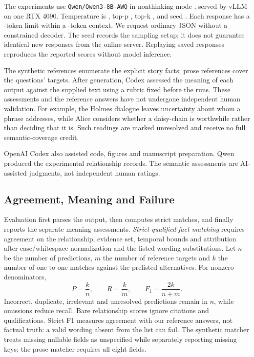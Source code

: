 \documentclass[a4paper,twoside]{article}
\begin{document}
The experiments use \texttt{Qwen/Qwen3-8B-AWQ} in nonthinking mode \cite{qwen2025,qwenmodel}, served by vLLM \cite{kwon2023} on one RTX 4090. Temperature is \Temperature, top-p \TopP, top-k \TopK, and seed \Seed. Each response has a \OutputTokens-token limit within a \ContextTokens-token context. We request ordinary JSON without a constrained decoder. The seed records the sampling setup; it does not guarantee identical new responses from the online server. Replaying saved responses reproduces the reported scores without model inference.

The synthetic references enumerate the explicit story facts; prose references cover the questions' targets. After generation, Codex assessed the meaning of each output against the supplied text using a rubric fixed before the runs. These assessments and the reference answers have not undergone independent human validation. For example, the Holmes dialogue leaves uncertainty about whom a phrase addresses, while Alice considers whether a daisy-chain is worthwhile rather than deciding that it is. Such readings are marked unresolved and receive no full semantic-coverage credit.

\label{sec:disclosure}
OpenAI Codex \cite{openai2025} also assisted code, figures and manuscript preparation. Qwen produced the experimental relationship records. The semantic assessments are AI-assisted judgments, not independent human ratings.




\subsection{Agreement, Meaning and Failure}
\noindent Evaluation first parses the output, then computes strict matches, and finally reports the separate meaning assessments. \emph{Strict qualified-fact matching} requires agreement on the relationship, evidence set, temporal bounds and attribution after case/whitespace normalization and the listed wording substitutions. Let $n$ be the number of predictions, $m$ the number of reference targets and $k$ the number of one-to-one matches against the prelisted alternatives. For nonzero denominators,
\begin{equation}
\label{eq:strict-scores}
P=\frac{k}{n}, \qquad
R=\frac{k}{m}, \qquad
F_1=\frac{2k}{n+m}.
\end{equation}
Incorrect, duplicate, irrelevant and unresolved predictions remain in $n$, while omissions reduce recall. Bare relationship scores ignore citations and qualifications. Strict F1 measures agreement with our reference answers, not factual truth: a valid wording absent from the list can fail. The synthetic matcher treats missing nullable fields as unspecified while separately reporting missing keys; the prose matcher requires all eight fields.
\end{document}
